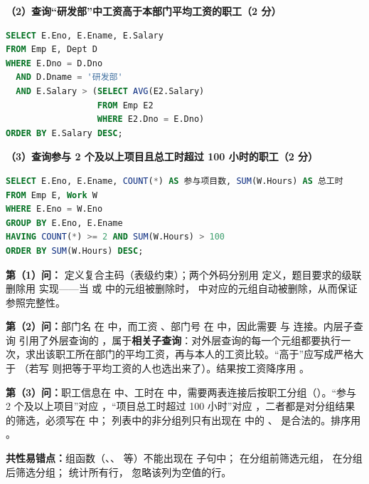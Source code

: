 \documentclass[a4paper,11pt]{article}
\begin{document}
\textbf{（2）查询“研发部”中工资高于本部门平均工资的职工（2 分）}
\begin{lstlisting}[language=SQL]
SELECT E.Eno, E.Ename, E.Salary
FROM Emp E, Dept D
WHERE E.Dno = D.Dno
  AND D.Dname = '研发部'
  AND E.Salary > (SELECT AVG(E2.Salary)
                  FROM Emp E2
                  WHERE E2.Dno = E.Dno)
ORDER BY E.Salary DESC;
\end{lstlisting}

\textbf{（3）查询参与 2 个及以上项目且总工时超过 100 小时的职工（2 分）}
\begin{lstlisting}[language=SQL]
SELECT E.Eno, E.Ename, COUNT(*) AS 参与项目数, SUM(W.Hours) AS 总工时
FROM Emp E, Work W
WHERE E.Eno = W.Eno
GROUP BY E.Eno, E.Ename
HAVING COUNT(*) >= 2 AND SUM(W.Hours) > 100
ORDER BY SUM(W.Hours) DESC;
\end{lstlisting}

\begin{analysis}
\textbf{第（1）问：} 定义复合主码（表级约束）；两个外码分别用  定义，题目要求的级联删除用  实现——当  或  中的元组被删除时， 中对应的元组自动被删除，从而保证参照完整性。

\textbf{第（2）问：}部门名  在  中，而工资 、部门号  在  中，因此需要  与  连接。内层子查询  引用了外层查询的 ，属于\textbf{相关子查询}：对外层查询的每一个元组都要执行一次，求出该职工所在部门的平均工资，再与本人的工资比较。“高于”应写成严格大于 \code{>}（若写 \code{>=} 则把等于平均工资的人也选出来了）。结果按工资降序用 。

\textbf{第（3）问：}职工信息在  中、工时在  中，需要两表连接后按职工分组（）。“参与 2 个及以上项目”对应 ，“项目总工时超过 100 小时”对应 ，二者都是对分组结果的筛选，必须写在  中； 列表中的非分组列只有出现在  中的 、 是合法的。排序用 。

\textbf{共性易错点：}组函数（、、 等）不能出现在  子句中； 在分组前筛选元组， 在分组后筛选分组； 统计所有行， 忽略该列为空值的行。
\end{analysis}
\end{document}
